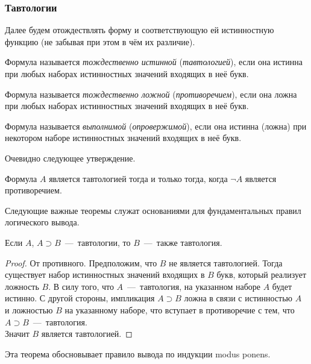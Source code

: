 \subsubsection{Тавтологии}
Далее будем отождествлять форму и соответствующую ей истинностную функцию (не забывая при этом в чём их различие).
\begin{definition*}
    Формула называется \textit{тождественно истинной} (\textit{тавтологией}), если она истинна при любых наборах истинностных значений входящих в неё букв.
\end{definition*}
\begin{definition*}
    Формула называется \textit{тождественно ложной} (\textit{противоречием}), если она ложна при любых наборах истинностных значений входящих в неё букв.
\end{definition*}
\begin{definition*}
    Формула называется \textit{выполнимой} (\textit{опровержимой}), если она истинна (ложна) при некотором наборе истинностных значений входящих в неё букв.
\end{definition*}
Очевидно следующее утверждение.
\begin{lemma}
    Формула $A$ является тавтологией тогда и только тогда, когда $\neg A$ является противоречием.
\end{lemma}
Следующие важные теоремы служат основаниями для фундаментальных правил логического вывода.

\begin{theorem}\label{th:modus_ponens}
    Если $A$, $A \supset B$~---~тавтологии, то $B$~---~также тавтология.
\end{theorem}
\begin{proof}
    От противного. Предположим, что $B$ не является тавтологией. Тогда существует набор истинностных значений входящих в $B$ букв, который реализует ложность $B$. В силу того, что $A$~---~тавтология, на указанном наборе $A$ будет истинно. С другой стороны, импликация $A \supset B$ ложна в связи с истинностью $A$ и ложностью $B$ на указанному наборе, что вступает в противоречие с тем, что $A \supset B$~---~тавтология. \\
    Значит $B$ является тавтологией.
\end{proof}

Эта теорема обосновывает правило вывода по индукции modus ponens.

